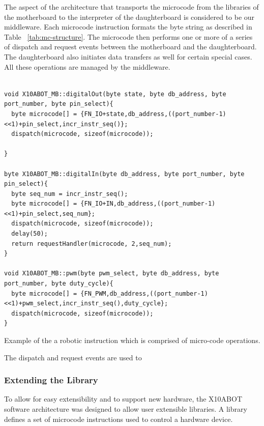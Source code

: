 	The aspect of the \xten architecture that transports the microcode from the libraries of the motherboard to the interpreter of the daughterboard is considered to be our middleware. Each microcode instruction formats the byte string as described in Table ~\ref{tab:mc-structure}. The microcode then performs one or more of a series of dispatch and request events between the motherboard and the daughterboard. The daughterboard also initiates data transfers as well for certain special cases. All these operations are managed by the middleware. 
\begin{listing}[H]
\footnotesize
\label{code:instr}
{\fontsize{8}{6}\selectfont
\begin{verbatim}

void X10ABOT_MB::digitalOut(byte state, byte db_address, byte port_number, byte pin_select){
  byte microcode[] = {FN_IO+state,db_address,((port_number-1)<<1)+pin_select,incr_instr_seq()};
  dispatch(microcode, sizeof(microcode));

}

byte X10ABOT_MB::digitalIn(byte db_address, byte port_number, byte pin_select){
  byte seq_num = incr_instr_seq();
  byte microcode[] = {FN_IO+IN,db_address,((port_number-1)<<1)+pin_select,seq_num};
  dispatch(microcode, sizeof(microcode));
  delay(50);
  return requestHandler(microcode, 2,seq_num);
}

void X10ABOT_MB::pwm(byte pwm_select, byte db_address, byte port_number, byte duty_cycle){
  byte microcode[] = {FN_PWM,db_address,((port_number-1)<<1)+pwm_select,incr_instr_seq(),duty_cycle};
  dispatch(microcode, sizeof(microcode));
}

\end{verbatim}
}
\caption{Example of the a robotic instruction which is comprised of micro-code operations.} 
\end{listing}	

The dispatch and request events are used to
	
	\subsubsection{Extending the Library} %
	\label{ssub:extending_the_library}
	
	To allow for easy extensibility and to support new hardware, the X10ABOT software architecture was designed to allow user extensible libraries. A library defines a set of microcode instructions used to control a hardware device.
	
